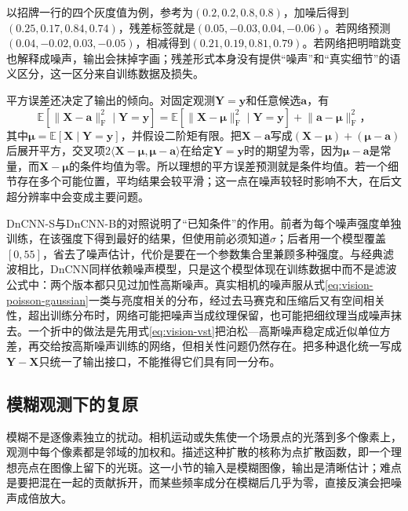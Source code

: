 以招牌一行的四个灰度值为例，参考为$(0.2,0.2,0.8,0.8)$，加噪后得到$(0.25,0.17,0.84,0.74)$，残差标签就是$(0.05,-0.03,0.04,-0.06)$。若网络预测$(0.04,-0.02,0.03,-0.05)$，相减得到$(0.21,0.19,0.81,0.79)$。若网络把明暗跳变也解释成噪声，输出会抹掉字画；残差形式本身没有提供“噪声”和“真实细节”的语义区分，这一区分来自训练数据及损失。

平方误差还决定了输出的倾向。对固定观测$\bm{Y}=\bm{y}$和任意候选$\bm{a}$，有
\begin{equation}
 \mathbb{E}\!\left[\lVert\bm{X}-\bm{a}\rVert_{\mathrm{F}}^2
                  \mid\bm{Y}=\bm{y}\right]
 =
 \mathbb{E}\!\left[\lVert\bm{X}-\bm{\mu}\rVert_{\mathrm{F}}^2
                  \mid\bm{Y}=\bm{y}\right]
 +\lVert\bm{a}-\bm{\mu}\rVert_{\mathrm{F}}^2\text{，}
 \label{eq:vision-conditional-mean}
\end{equation}
其中$\bm{\mu}=\mathbb{E}[\bm{X}\mid\bm{Y}=\bm{y}]$，并假设二阶矩有限。把$\bm{X}-\bm{a}$写成$(\bm{X}-\bm{\mu})+(\bm{\mu}-\bm{a})$后展开平方，交叉项$2\langle\bm{X}-\bm{\mu},\bm{\mu}-\bm{a}\rangle$在给定$\bm{Y}=\bm{y}$时的期望为零，因为$\bm{\mu}-\bm{a}$是常量，而$\bm{X}-\bm{\mu}$的条件均值为零。所以理想的平方误差预测就是条件均值。若一个细节存在多个可能位置，平均结果会较平滑；这一点在噪声较轻时影响不大，在后文超分辨率中会变成主要问题。

DnCNN-S与DnCNN-B的对照说明了“已知条件”的作用。前者为每个噪声强度单独训练，在该强度下得到最好的结果，但使用前必须知道$\sigma$；后者用一个模型覆盖$[0,55]$，省去了噪声估计，代价是要在一个参数集合里兼顾多种强度。与经典滤波相比，DnCNN同样依赖噪声模型，只是这个模型体现在训练数据中而不是滤波公式中：两个版本都只见过加性高斯噪声。真实相机的噪声服从式\eqref{eq:vision-poisson-gaussian}一类与亮度相关的分布，经过去马赛克和压缩后又有空间相关性，超出训练分布时，网络可能把噪声当成纹理保留，也可能把细纹理当成噪声抹去。一个折中的做法是先用式\eqref{eq:vision-vst}把泊松—高斯噪声稳定成近似单位方差，再交给按高斯噪声训练的网络，但相关性问题仍然存在。把多种退化统一写成$\bm{Y}-\bm{X}$只统一了输出接口，不能推得它们具有同一分布。

\subsection{模糊观测下的复原}
\label{sec:vision-restoration-deblurring}

模糊不是逐像素独立的扰动。相机运动或失焦使一个场景点的光落到多个像素上，观测中每个像素都是邻域的加权和。描述这种扩散的核称为点扩散函数，即一个理想亮点在图像上留下的光斑。这一小节的输入是模糊图像，输出是清晰估计；难点是要把混在一起的贡献拆开，而某些频率成分在模糊后几乎为零，直接反演会把噪声成倍放大。

